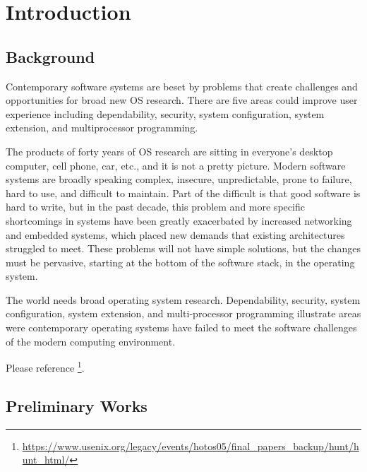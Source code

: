 \documentclass{swfcthesis}
\begin{document}

\makepreliminarypages%
\frontmatter          
\tableofcontents     %
\listoffigures       %
\listoftables        %
\listoffixmes

\mainmatter

\chapter{Introduction}

\section{Background}
\label{sec:background}

Contemporary software systems are beset by problems that create challenges and
opportunities for broad new OS research. There are five areas could improve user
experience including dependability, security, system configuration, system extension, and
multiprocessor programming.

The products of forty years of OS research are sitting in everyone's desktop
computer, cell phone, car, etc., and it is not a pretty picture.
Modern software systems are broadly speaking complex, insecure, unpredictable, prone to
failure, hard to use, and difficult to maintain. Part of the difficult is that good
software is hard to write, but in the past decade, this problem and more specific
shortcomings in systems have been greatly exacerbated by increased networking and embedded
systems, which placed new demands that existing architectures struggled to meet. These
problems will not have simple solutions, but the changes must be pervasive, starting at
the bottom of the software stack, in the operating system.

The world needs broad operating system research. Dependability, security, system
configuration, system extension, and multi-processor programming
illustrate areas were contemporary operating systems have failed to meet the software
challenges of the modern computing environment.

Please reference
\footnote{\url{https://www.usenix.org/legacy/events/hotos05/final_papers_backup/hunt/hunt_html/}}.


\section{Preliminary Works}
\end{document}
